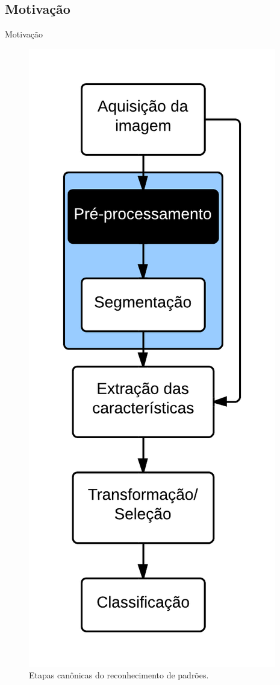 \documentclass{beamer}
\begin{document}
\subsection{Motivação}
\begin{frame}[plain]{Motivação}
\begin{figure}
    \includegraphics[height=0.9\textheight]{figuras/flow.png}
    \caption{Etapas canônicas do reconhecimento de padrões.}
\end{figure}
\end{frame}
\end{document}
